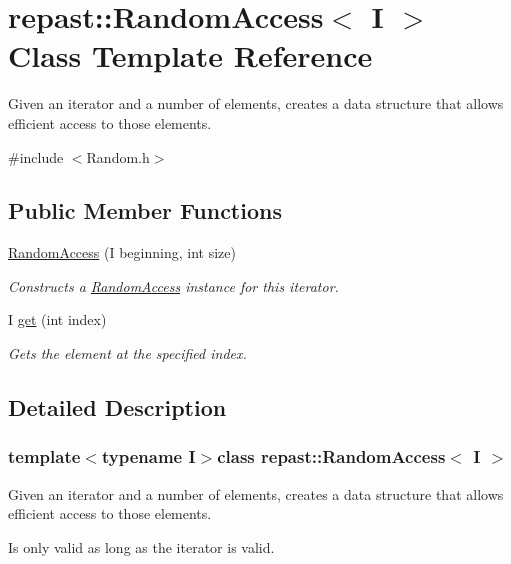 \hypertarget{classrepast_1_1_random_access}{\section{repast\-:\-:Random\-Access$<$ I $>$ Class Template Reference}
\label{classrepast_1_1_random_access}
}


Given an iterator and a number of elements, creates a data structure that allows efficient access to those elements.  




{\ttfamily \#include $<$Random.\-h$>$}

\subsection*{Public Member Functions}
\begin{DoxyCompactItemize}
\item 
\hyperlink{classrepast_1_1_random_access_a44b227e4aabb796ca349fd01e533855b}{Random\-Access} (I beginning, int size)
\begin{DoxyCompactList}\small\item\em Constructs a \hyperlink{classrepast_1_1_random_access}{Random\-Access} instance for this iterator. \end{DoxyCompactList}\item 
I \hyperlink{classrepast_1_1_random_access_a8964a8f07e2efcc26ecf3df1a1ad59b9}{get} (int index)
\begin{DoxyCompactList}\small\item\em Gets the element at the specified index. \end{DoxyCompactList}\end{DoxyCompactItemize}


\subsection{Detailed Description}
\subsubsection*{template$<$typename I$>$class repast\-::\-Random\-Access$<$ I $>$}

Given an iterator and a number of elements, creates a data structure that allows efficient access to those elements. 

Is only valid as long as the iterator is valid.

